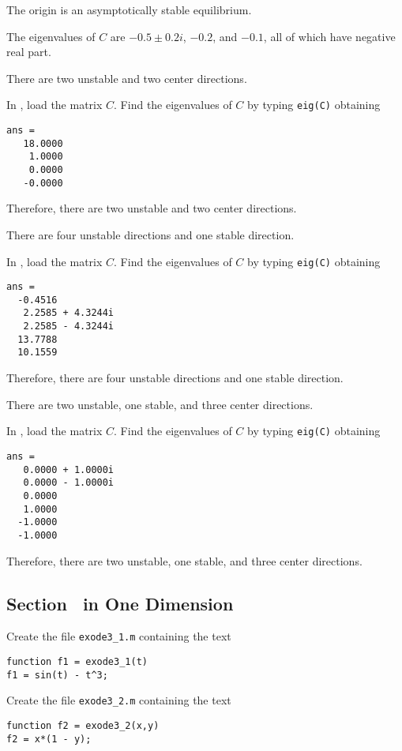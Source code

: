 \ans The origin is an asymptotically stable equilibrium.

\soln The eigenvalues of $C$ are $-0.5 \pm 0.2i$, $-0.2$, and $-0.1$, all
of which have negative real part.


 \ans There are two unstable and two center directions.

\soln In \Matlabp, load the matrix $C$.  Find the eigenvalues of $C$ by
typing {\tt eig(C)} obtaining
\begin{verbatim}
ans =
   18.0000
    1.0000
    0.0000
   -0.0000
\end{verbatim}
Therefore, there are two unstable and two center directions.

 \ans There are four unstable directions and one stable 
direction.

\soln In \Matlabp, load the matrix $C$.  Find the eigenvalues of $C$ by
typing {\tt eig(C)} obtaining
\begin{verbatim}
ans =
  -0.4516          
   2.2585 + 4.3244i
   2.2585 - 4.3244i
  13.7788          
  10.1559   
\end{verbatim}
Therefore, there are four unstable directions and one stable direction.


 \ans There are two unstable, one stable, and three center 
directions.


\soln In \Matlabp, load the matrix $C$.  Find the eigenvalues of $C$ by
typing {\tt eig(C)} obtaining
\begin{verbatim}
ans =
   0.0000 + 1.0000i
   0.0000 - 1.0000i
   0.0000          
   1.0000          
  -1.0000          
  -1.0000  
\end{verbatim}
Therefore, there are two unstable, one stable, and three center directions.




\subsection*{Section~\protect{\ref{S:ode45}}  in One Dimension}

Create the file {\tt exode3\_1.m} containing the text
\begin{verbatim}
function f1 = exode3_1(t)
f1 = sin(t) - t^3;
\end{verbatim}

Create the file {\tt exode3\_2.m} containing the text
\begin{verbatim}
function f2 = exode3_2(x,y)
f2 = x*(1 - y);
\end{verbatim}

